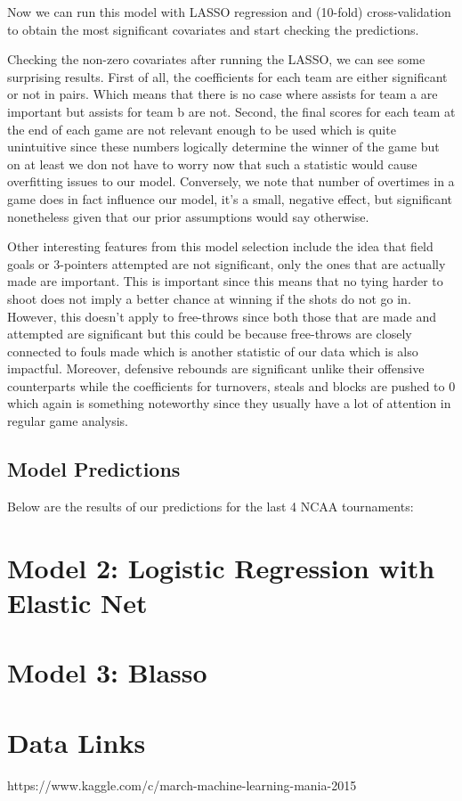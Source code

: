 \documentclass{article} %
\begin{document}
Now we can run this model with LASSO regression and (10-fold) cross-validation to obtain the most significant covariates and start checking the predictions.\

Checking the non-zero covariates after running the LASSO, we can see some surprising results. 
First of all, the coefficients for each team are either significant or not in pairs. Which means that there is no case where assists for team a are important but assists for team b are not. Second, the final scores for each team at the end of each game are not relevant enough to be used which is quite unintuitive since these numbers logically determine the winner of the game but on at least we don not have to worry now that such a statistic would cause overfitting issues to our model. Conversely, we note that number of overtimes in a game does in fact influence our model, it's a small, negative effect, but significant nonetheless given that our prior assumptions would say otherwise. \

Other interesting features from this model selection include the idea that field goals or 3-pointers attempted are not significant, only the ones that are actually made are important. This is important since this means that no tying harder to shoot does not imply a better chance at winning if the shots do not go in. However, this doesn't apply to free-throws since both those that are made and attempted are significant but this could be because free-throws are closely connected to fouls made which is another statistic of our data which is also impactful. Moreover, defensive rebounds are significant unlike their offensive counterparts while the coefficients for turnovers, steals and blocks are pushed to 0 which again is something noteworthy since they usually have a lot of attention in regular game analysis.\

\subsection{Model Predictions}

Below are the results of our predictions for the last 4 NCAA tournaments:\


\section{Model 2: Logistic Regression with Elastic Net}
\section{Model 3: Blasso}

\section{Data Links}
https://www.kaggle.com/c/march-machine-learning-mania-2015
\end{document}
